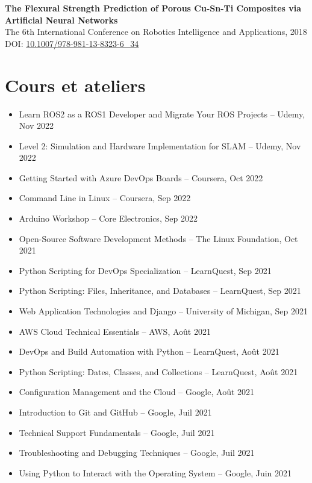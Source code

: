 \documentclass[11pt,a4paper]{article}
\begin{document}
\textbf{The Flexural Strength Prediction of Porous Cu-Sn-Ti Composites via Artificial Neural Networks}\\
The 6th International Conference on Robotics Intelligence and Applications, 2018\\
DOI: \href{https://doi.org/10.1007/978-981-13-8323-6_34}{10.1007/978-981-13-8323-6\_34}

\section*{Cours et ateliers}

\begin{itemize}
    \item Learn ROS2 as a ROS1 Developer and Migrate Your ROS Projects -- Udemy, Nov 2022
    \item Level 2: Simulation and Hardware Implementation for SLAM -- Udemy, Nov 2022
    \item Getting Started with Azure DevOps Boards -- Coursera, Oct 2022
    \item Command Line in Linux -- Coursera, Sep 2022
    \item Arduino Workshop -- Core Electronics, Sep 2022
    \item Open-Source Software Development Methods -- The Linux Foundation, Oct 2021
    \item Python Scripting for DevOps Specialization -- LearnQuest, Sep 2021
    \item Python Scripting: Files, Inheritance, and Databases -- LearnQuest, Sep 2021
    \item Web Application Technologies and Django -- University of Michigan, Sep 2021
    \item AWS Cloud Technical Essentials -- AWS, Août 2021
    \item DevOps and Build Automation with Python -- LearnQuest, Août 2021
    \item Python Scripting: Dates, Classes, and Collections -- LearnQuest, Août 2021
    \item Configuration Management and the Cloud -- Google, Août 2021
    \item Introduction to Git and GitHub -- Google, Juil 2021
    \item Technical Support Fundamentals -- Google, Juil 2021
    \item Troubleshooting and Debugging Techniques -- Google, Juil 2021
    \item Using Python to Interact with the Operating System -- Google, Juin 2021

\end{itemize}
\end{document}
